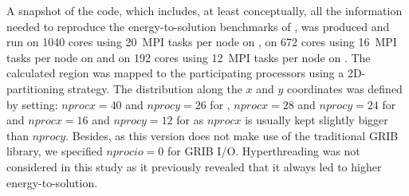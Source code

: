 A snapshot of the code, which includes, at least conceptually, all the
information needed  to reproduce the  energy-to-solution benchmarks of
\cosmoart, was produced  and run on 1040 cores  using 20~MPI tasks per
node on  \monch, on 672 cores  using 16~MPI tasks per  node on \pilat
and  on  192  cores  using  12~MPI  tasks per  node  on  \tinto.   The
calculated region  was mapped to the participating  processors using a
2D-partitioning  strategy.  The  distribution  along the  $x$ and  $y$
coordinates was  defined by  setting: $nprocx=40$ and  $nprocy=26$ for
\monch,  $nprocx=28$ and  $nprocy=24$ for  \pilat and  $nprocx=16$ and
$nprocy=12$  for \tinto as  $nprocx$ is  usually kept  slightly bigger
than  $nprocy$. Besides,  as this  version does  not make  use  of the
traditional  GRIB  library, we  specified  $nprocio=0$  for GRIB  I/O.
Hyperthreading  was not  considered  in this  study  as it  previously
revealed that it always led to higher energy-to-solution.
